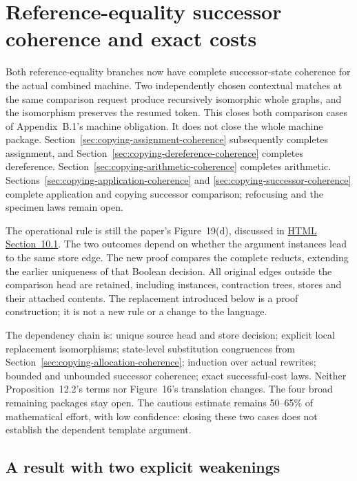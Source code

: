 \clearpage
\section{Reference-equality successor coherence and exact costs}
\label{sec:copying-equality-coherence}
Both reference-equality branches now have complete successor-state coherence
for the actual combined machine. Two independently chosen contextual matches
at the same comparison request produce recursively isomorphic whole graphs,
and the isomorphism preserves the resumed token. This closes both comparison
cases of Appendix~B.1's machine obligation. It does not close the whole
machine package. Section~\ref{sec:copying-assignment-coherence} subsequently
completes assignment, and Section~\ref{sec:copying-dereference-coherence}
completes dereference. Section~\ref{sec:copying-arithmetic-coherence} completes
arithmetic. Sections~\ref{sec:copying-application-coherence} and \ref{sec:copying-successor-coherence} complete application and copying successor comparison; refocusing and the specimen laws remain open.

The operational rule is still the paper's Figure~19(d), discussed in
\href{https://arxiv.org/html/1907.01257v5\#S10.SS1}{HTML Section~10.1}.
The two outcomes depend on whether the argument instances lead to the same
store edge. The new proof compares the complete reducts, extending the earlier
uniqueness of that Boolean decision. All original edges outside the comparison
head are retained, including instances, contraction trees, stores and their
attached contents. The replacement introduced below is a proof construction;
it is not a new rule or a change to the language.

The dependency chain is: unique source head and store decision; explicit
local replacement isomorphisms; state-level substitution congruences from
Section~\ref{sec:copying-allocation-coherence}; induction over actual rewrites;
bounded and unbounded successor coherence; exact successful-cost laws.
Neither Proposition~12.2's terms nor Figure~16's translation changes.
The four broad remaining packages stay open. The cautious estimate remains
50--65\% of mathematical effort, with low confidence: closing these two
cases does not establish the dependent template argument.

\subsection{A result with two explicit weakenings}

